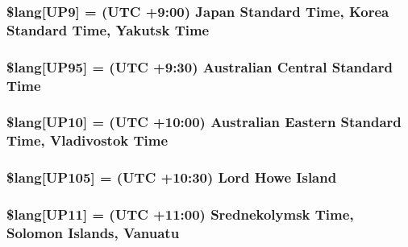 \subsubsection[{\$lang}]{\setlength{\rightskip}{0pt plus 5cm}\$lang\mbox{[}\textquotesingle{}U\+P9\textquotesingle{}\mbox{]} = \textquotesingle{}(U\+T\+C +9\+:00) Japan Standard Time, Korea Standard Time, Yakutsk Time\textquotesingle{}}\label{date__lang_8php_aa112bfd057369e5adb437c55457c9f79}
\hypertarget{date__lang_8php_a96965669ac4830ab024b39a4ebb763f1}{}
\subsubsection[{\$lang}]{\setlength{\rightskip}{0pt plus 5cm}\$lang\mbox{[}\textquotesingle{}U\+P95\textquotesingle{}\mbox{]} = \textquotesingle{}(U\+T\+C +9\+:30) Australian Central Standard Time\textquotesingle{}}\label{date__lang_8php_a96965669ac4830ab024b39a4ebb763f1}
\hypertarget{date__lang_8php_ab55df5b1ac6457c16ea32f01070966f6}{}
\subsubsection[{\$lang}]{\setlength{\rightskip}{0pt plus 5cm}\$lang\mbox{[}\textquotesingle{}U\+P10\textquotesingle{}\mbox{]} = \textquotesingle{}(U\+T\+C +10\+:00) Australian Eastern Standard Time, Vladivostok Time\textquotesingle{}}\label{date__lang_8php_ab55df5b1ac6457c16ea32f01070966f6}
\hypertarget{date__lang_8php_aeb674ae9d76fd6d0d9c9e77ed5a212e9}{}
\subsubsection[{\$lang}]{\setlength{\rightskip}{0pt plus 5cm}\$lang\mbox{[}\textquotesingle{}U\+P105\textquotesingle{}\mbox{]} = \textquotesingle{}(U\+T\+C +10\+:30) Lord Howe Island\textquotesingle{}}\label{date__lang_8php_aeb674ae9d76fd6d0d9c9e77ed5a212e9}
\hypertarget{date__lang_8php_a463ad4d63523352c17685f734b4ec7cc}{}
\subsubsection[{\$lang}]{\setlength{\rightskip}{0pt plus 5cm}\$lang\mbox{[}\textquotesingle{}U\+P11\textquotesingle{}\mbox{]} = \textquotesingle{}(U\+T\+C +11\+:00) Srednekolymsk Time, Solomon Islands, Vanuatu\textquotesingle{}}\label{date__lang_8php_a463ad4d63523352c17685f734b4ec7cc}
\hypertarget{date__lang_8php_a46fa8957c8e606d1641bbcdd75cd2df0}{}
